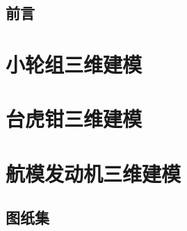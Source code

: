 \documentclass[a4paper,twoside]{book}
\begin{document}

\title{}
\author{}
\date{\today}
\maketitle
\frontmatter
\tableofcontents
\chapter*{前言}
\mainmatter
\graphicspath{{pdf/}{png/}}
\part{小轮组三维建模}






\part{台虎钳三维建模}








\part{航模发动机三维建模}









\backmatter
\appendix
\chapter{图纸集}
\printindex
\end{document}
